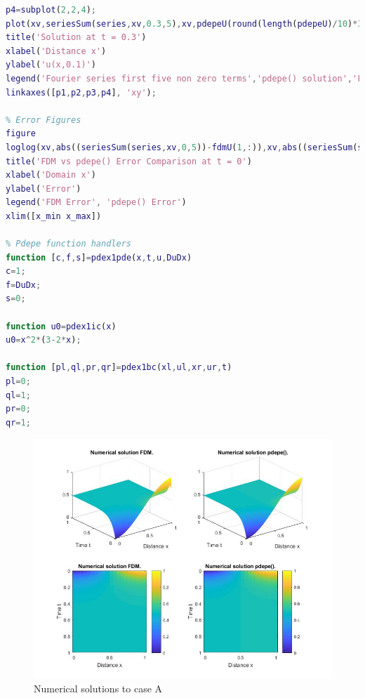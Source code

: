 \documentclass{article}
\begin{document}
\begin{lstlisting}[language=Matlab]
p4=subplot(2,2,4);
plot(xv,seriesSum(series,xv,0.3,5),xv,pdepeU(round(length(pdepeU)/10)*3,:),'-.',xv,fdmU(round(length(fdmU)/10)*3,:),'*')
title('Solution at t = 0.3')
xlabel('Distance x')
ylabel('u(x,0.1)')
legend('Fourier series first five non zero terms','pdepe() solution','Finite Difference method')
linkaxes([p1,p2,p3,p4], 'xy');

% Error Figures
figure
loglog(xv,abs((seriesSum(series,xv,0,5))-fdmU(1,:)),xv,abs((seriesSum(series,xv,0,5))-pdepeU(2,:)));
title('FDM vs pdepe() Error Comparison at t = 0')
xlabel('Domain x')
ylabel('Error')
legend('FDM Error', 'pdepe() Error')
xlim([x_min x_max])

% Pdepe function handlers
function [c,f,s]=pdex1pde(x,t,u,DuDx)
c=1;
f=DuDx;
s=0;

function u0=pdex1ic(x)
u0=x^2*(3-2*x);

function [pl,ql,pr,qr]=pdex1bc(xl,ul,xr,ur,t)
pl=0;
ql=1;
pr=0;
qr=1;
\end{lstlisting}
\begin{figure}
	\begin{center}
		\includegraphics[width=\textwidth,height=\textheight,keepaspectratio]{MATLAB/A1.jpg}
	\end{center}
	\caption{Numerical solutions to case A}
\end{figure}
\end{document}
